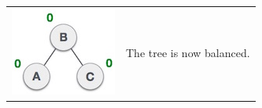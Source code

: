 \begin{longtable}{| M{.20\textwidth} | p{.80\textwidth} |}
\hline
\includegraphics[scale=.50]{images/balanced_avl_tree.jpg} & The tree is now balanced.
\hline
\end{longtable}